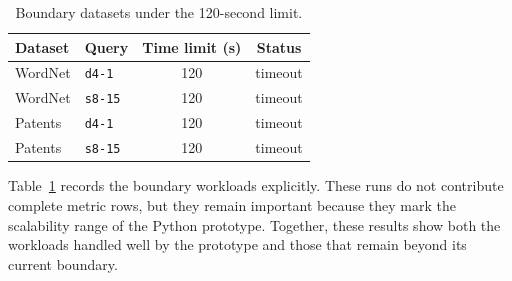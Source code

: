 \begin{table}[t]
  \caption{Boundary datasets under the 120-second limit.}
  \label{tab:boundary-datasets}
  \centering
  \small
  \begin{tabular}{llcc}
    \toprule
    Dataset & Query & Time limit (s) & Status \\
    \midrule
    WordNet & \texttt{d4-1} & 120 & timeout \\
    WordNet & \texttt{s8-15} & 120 & timeout \\
    Patents & \texttt{d4-1} & 120 & timeout \\
    Patents & \texttt{s8-15} & 120 & timeout \\
    \bottomrule
  \end{tabular}
\end{table}

Table~\ref{tab:boundary-datasets} records the boundary workloads explicitly. These runs do not contribute complete metric rows, but they remain important because they mark the scalability range of the Python prototype. Together, these results show both the workloads handled well by the prototype and those that remain beyond its current boundary.
